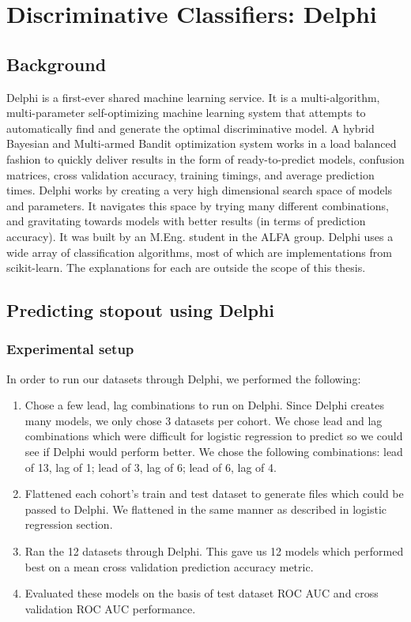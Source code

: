 \chapter{Discriminative Classifiers: Delphi} \label{chap:delphi} 
\section{Background}
Delphi is a first-ever shared machine learning service. It is a multi-algorithm, multi-parameter self-optimizing machine learning system that attempts to automatically find and generate the optimal discriminative model. A hybrid Bayesian and Multi-armed Bandit optimization system works in a load balanced fashion to quickly deliver results in the form of ready-to-predict models, confusion matrices, cross validation accuracy, training timings, and average prediction times. Delphi works by creating a very high dimensional search space of models and parameters. It navigates this space by trying many different combinations, and gravitating towards models with better results (in terms of prediction accuracy). It was built by an M.Eng. student in the ALFA group. Delphi uses a wide array of classification algorithms, most of which are implementations from scikit-learn. The explanations for each are outside the scope of this thesis.

\section{Predicting stopout using Delphi}

\subsection{Experimental setup}
In order to run our datasets through Delphi, we performed the following:
\begin{enumerate}
\item Chose a few lead, lag combinations to run on Delphi. Since Delphi creates many models, we only chose 3 datasets per cohort. We chose lead and lag combinations which were difficult for logistic regression to predict so we could see if Delphi would perform better. We chose the following combinations: lead of 13, lag of 1; lead of 3, lag of 6; lead of 6, lag of 4.
\item Flattened each cohort's train and test dataset to generate files which could be passed to Delphi. We flattened in the same manner as described in logistic regression section.
\item Ran the 12 datasets through Delphi. This gave us 12 models which performed best on a mean cross validation prediction accuracy metric.
\item Evaluated these models on the basis of test dataset ROC AUC and cross validation ROC AUC performance.
\end{enumerate}

